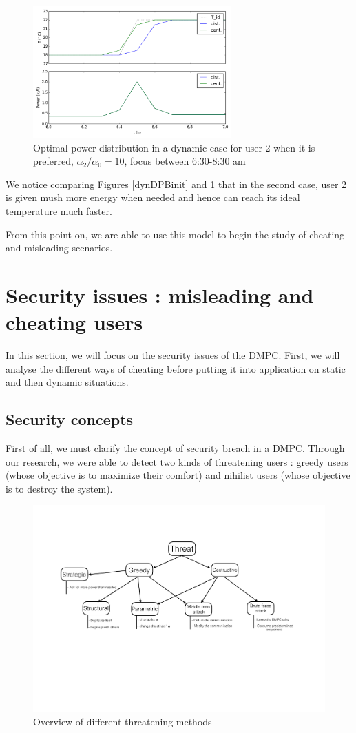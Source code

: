 \documentclass[conference]{IEEEtran}
\edef\hc{\string:}
\begin{document}
\begin{figure}[H]
\centering
\includegraphics[width=3in]{dynDMPC_chtZOOM.png}
\caption{Optimal power distribution in a dynamic case for user 2 when it is preferred, $\alpha_2 / \alpha_0 = 10$, focus between 6\hc 30-8\hc 30 am }
\label{dynDPBcom}
\end{figure}
 We notice comparing Figures \ref{dynDPBinit} and \ref{dynDPBcom} that in the second case, user 2 is given mush more energy when needed and hence can reach its ideal temperature much faster.

From this point on, we are able to use this model to begin the study of cheating and misleading scenarios.
  
\section{Security issues : misleading and cheating users}
In this section, we will focus on the security issues of the DMPC. First, we will analyse the different ways of cheating before putting it into application on static and then dynamic situations. 

\subsection{Security concepts}
First of all, we must clarify the concept of security breach in a DMPC. Through our research, we were able to detect two kinds of threatening users : greedy users (whose objective is to maximize their comfort) and nihilist users (whose objective is to destroy the system). 

 \begin{figure}[!t]
\centering
\includegraphics[width=5.5in]{mindmap}
\caption{Overview of different threatening methods}
\label{mindmap}
\end{figure}
\end{document}
